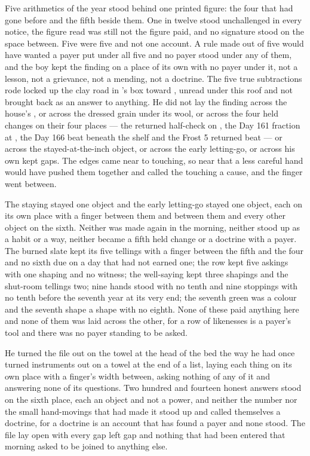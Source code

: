 Five arithmetics of the year stood behind one printed figure: the four that had gone before and the fifth beside them. One in twelve stood unchallenged in every notice, the figure read was still not the figure paid, and no signature stood on the space between. Five were five and not one account. A rule made out of five would have wanted a payer put under all five and no payer stood under any of them, and the boy kept the finding on a place of its own with no payer under it, not a lesson, not a grievance, not a mending, not a doctrine. The five true subtractions rode locked up the clay road in 's box toward , unread under this roof and not brought back as an answer to anything. He did not lay the finding across the house's , or across the dressed grain under its wool, or across the four held changes on their four places --- the returned half-check on , the Day 161 fraction at , the Day 166 beat beneath the shelf and the Frost 5 returned beat --- or across the stayed-at-the-inch object, or across the early letting-go, or across his own kept gaps. The edges came near to touching, so near that a less careful hand would have pushed them together and called the touching a cause, and the finger went between.

The staying stayed one object and the early letting-go stayed one object, each on its own place with a finger between them and between them and every other object on the sixth. Neither was made again in the morning, neither stood up as a habit or a way, neither became a fifth held change or a doctrine with a payer. The burned slate kept its five tellings with a finger between the fifth and the four and no sixth due on a day that had not earned one; the row kept five askings with one shaping and no witness; the well-saying kept three shapings and the shut-room tellings two; nine hands stood with no tenth and nine stoppings with no tenth before the seventh year at its very end; the seventh green was a colour and the seventh shape a shape with no eighth. None of these paid anything here and none of them was laid across the other, for a row of likenesses is a payer's tool and there was no payer standing to be asked.

He turned the file out on the towel at the head of the bed the way he had once turned instruments out on a towel at the end of a list, laying each thing on its own place with a finger's width between, asking nothing of any of it and answering none of its questions. Two hundred and fourteen honest answers stood on the sixth place, each an object and not a power, and neither the number nor the small hand-movings that had made it stood up and called themselves a doctrine, for a doctrine is an account that has found a payer and none stood. The file lay open with every gap left gap and nothing that had been entered that morning asked to be joined to anything else.

